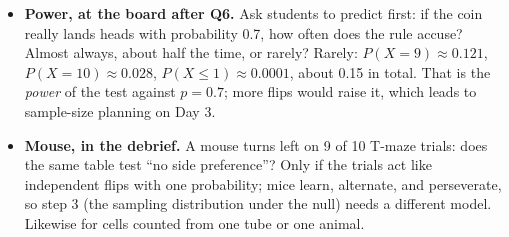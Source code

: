 \documentclass[11pt]{article}
\begin{document}
\begin{itemize}[leftmargin=1.2em, itemsep=3pt]
    the rule accuses an honest dealer with probability 0.021 and a cheater with probability 0.736
    (9 or 10 heads, or 0 or 1, at $p = 0.9$).
    Among accused dealers, the fraction that are honest is
    \[
      \frac{0.99 \times 0.021}{0.99 \times 0.021 + 0.01 \times 0.736} \approx 0.74:
    \]
    most accusations are wrong, although the rule is a 5\% rule (Day 1's conditional probability).
    And not accusing does not prove honesty: 8 heads is no accusation, yet an unfair coin easily gives 8 heads.
  \item \textbf{Power, at the board after Q6.} Ask students to predict first:
    if the coin really lands heads with probability 0.7, how often does the rule accuse?
    Almost always, about half the time, or rarely?
    Rarely: $P(X = 9) \approx 0.121$, $P(X = 10) \approx 0.028$, $P(X \le 1) \approx 0.0001$, about 0.15 in total.
    That is the \emph{power} of the test against $p = 0.7$; more flips would raise it,
    which leads to sample-size planning on Day 3.
  \item \textbf{Mouse, in the debrief.} A mouse turns left on 9 of 10 T-maze trials:
    does the same table test ``no side preference''?
    Only if the trials act like independent flips with one probability; mice learn, alternate, and perseverate,
    so step 3 (the sampling distribution under the null) needs a different model.
    Likewise for cells counted from one tube or one animal.
\end{itemize}
\fi
\end{document}
